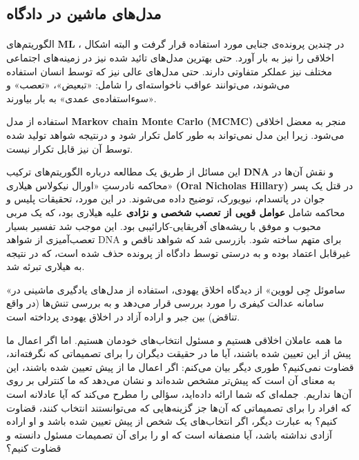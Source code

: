 \documentclass[10pt,oneside]{book}
\begin{document}
    \subsection{مدل‌های ماشین در دادگاه}
    \paragraph{}
    الگوریتم‌های \textenglish{\textbf{ML}} ، در چندین پرونده‌ی جنایی مورد استفاده قرار گرفت و البته اشکال اخلاقی را نیز به بار آورد.
    حتی بهترین مدل‌های تائید شده نیز در زمینه‌های اجتماعی مختلف نیز عملکر متفاوتی دارند.
    حتی مدل‌های عالی نیز که توسط انسان استفاده می‌شوند، می‌توانند عواقب ناخواسته‌ای را شامل: «تبعیض»، «تعصب» و «سوءاستفاده‌ی عمدی» به بار بیاورند.

    استفاده از مدل \textenglish{\textbf{Markov chain Monte Carlo (MCMC)}} منجر به معضل اخلاقی می‌شود.
    زیرا این مدل نمی‌تواند به طور کامل تکرار شود و درنتیجه شواهد تولید شده توسط آن نیز قابل تکرار نیست.

    این مسائل از طریق یک مطالعه درباره الگوریتم‌های ترکیب \textenglish{\textbf{DNA}}  و نقش آن‌ها در محاکمه نادرستِ «اورال نیکولاس هیلاری» \textenglish{\textbf{(Oral Nicholas Hillary)}}  در قتل یک پسر جوان در پاتسدام، نیویورک، توضیح داده می‌شوند.
    در این مورد، تحقیقات پلیس و محاکمه شامل \textbf{عوامل قویی از تعصب شخصی و نژادی} علیه هیلاری بود، که یک مربی محبوب و موفق با ریشه‌های آفریقایی-کارائیبی بود.
    این موجب شد تفسیر بسیار تعصب‌آمیزی از شواهد DNA برای متهم ساخته شود.
    بازرسی شد که شواهد ناقص و غیرقابل اعتماد بوده و به درستی توسط دادگاه از پرونده حذف شده است، که در نتیجه به هیلاری تبرئه شد.

    «ساموئل جِی لووین» از دیدگاه اخلاق یهودی، استفاده از مدل‌های یادگیری ماشینی در سامانه عدالت کیفری را مورد بررسی قرار می‌دهد و به بررسی تنش‌ها (در واقع تناقض) بین جبر و اراده آزاد در اخلاق یهودی پرداخته است.

    ما همه عاملان اخلاقی هستیم و مسئول انتخاب‌های خودمان هستیم.
    اما اگر اعمال ما پیش از این تعیین شده باشند، آیا ما در حقیقت دیگران را برای تصمیماتی که نگرفته‌اند، قضاوت نمی‌کنیم؟ طوری دیگر بیان می‌کنم: اگر اعمال ما از پیش تعیین شده باشند، این به معنای آن است که پیش‌تر مشخص شده‌اند و نشان می‌دهد که ما کنترلی بر روی آن‌ها نداریم.\     جمله‌ای که شما ارائه داده‌اید، سؤالی را مطرح می‌کند که آیا عادلانه است که افراد را برای تصمیماتی که آن‌ها جز گزینه‌هایی که می‌توانستند انتخاب کنند، قضاوت کنیم؟ به عبارت دیگر، اگر انتخاب‌های یک شخص از پیش تعیین شده باشد و او اراده آزادی نداشته باشد، آیا منصفانه است که او را برای آن تصمیمات مسئول دانسته و قضاوت کنیم؟
\end{document}
